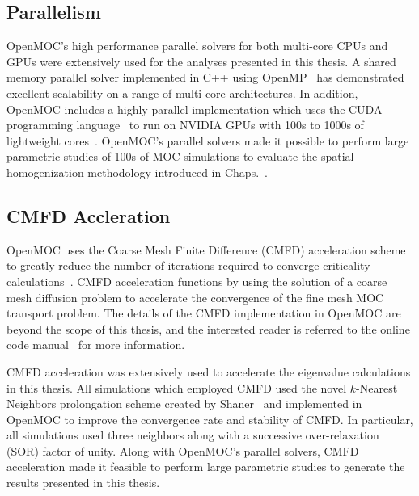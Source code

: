 \subsection{Parallelism}
\label{subsubsec:chap4-openmoc-parallel}

OpenMOC's high performance parallel solvers for both multi-core \ac{CPUs} and \ac{GPUs} were extensively used for the analyses presented in this thesis. A shared memory parallel solver implemented in C++ using OpenMP~\cite{openmp2013} has demonstrated excellent scalability on a range of multi-core architectures\cite{boyd2016parallel}. In addition, OpenMOC includes a highly parallel implementation which uses the CUDA programming language~\cite{nvidia2012cuda} to run on NVIDIA \ac{GPUs} with 100s to 1000s of lightweight cores~\cite{boyd2013massively}. OpenMOC's parallel solvers made it possible to perform large parametric studies of 100s of \ac{MOC} simulations to evaluate the spatial homogenization methodology introduced in Chaps.~.


\subsection{CMFD Accleration}
\label{subsubsec:chap4-openmoc-cmfd}

OpenMOC uses the Coarse Mesh Finite Difference (CMFD) acceleration scheme to greatly reduce the number of iterations required to converge criticality calculations~\cite{boyd2014openmoc}. \ac{CMFD} acceleration functions by using the solution of a coarse mesh diffusion problem to accelerate the convergence of the fine mesh \ac{MOC} transport problem. The details of the \ac{CMFD} implementation in OpenMOC are beyond the scope of this thesis, and the interested reader is referred to the online code manual~\cite{openmoc2016manual} for more information. 

\ac{CMFD} acceleration was extensively used to accelerate the eigenvalue calculations in this thesis. All simulations which employed \ac{CMFD} used the novel $k$-Nearest Neighbors prolongation scheme created by Shaner~\cite{shaner2015cmfd} and implemented in OpenMOC to improve the convergence rate and stability of \ac{CMFD}. In particular, all simulations used three neighbors along with a successive over-relaxation (SOR) factor of unity. Along with OpenMOC's parallel solvers, \ac{CMFD} acceleration made it feasible to perform large parametric studies to generate the results presented in this thesis.

